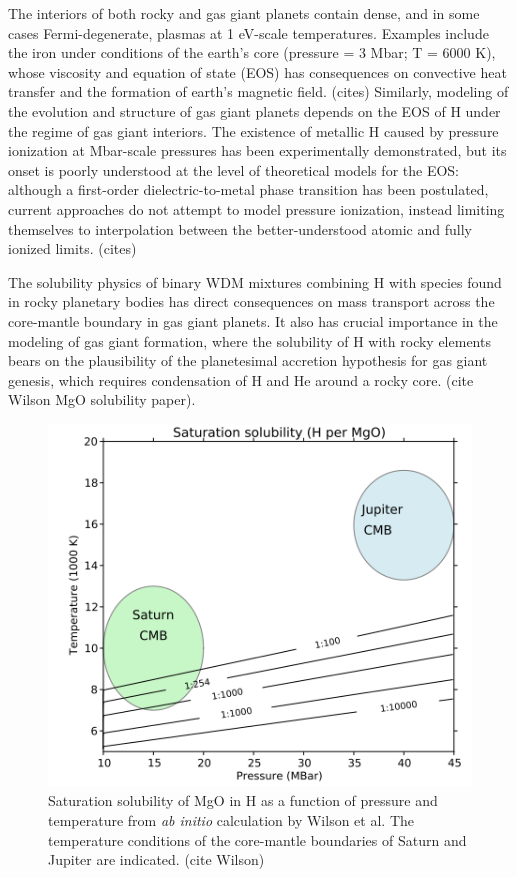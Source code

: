 \documentclass [11pt, proquest, article] {uwthesis}[2016/11/22]
\begin{document}
The interiors of both rocky and gas giant planets contain dense, and in some cases Fermi-degenerate, plasmas at 1 eV-scale temperatures. Examples include the iron under conditions of the earth's core (pressure = 3 Mbar; T = 6000 K), whose viscosity and equation of state (EOS) has consequences on convective heat transfer and the formation of earth's magnetic field. (cites) Similarly, modeling of the evolution and structure of gas giant planets depends on the EOS of H under the regime of gas giant interiors. The existence of metallic H caused by pressure ionization at Mbar-scale pressures has been experimentally demonstrated, but its onset is poorly understood at the level of theoretical models for the EOS: although a first-order dielectric-to-metal phase transition has been postulated, current approaches do not attempt to model pressure ionization, instead limiting themselves to interpolation between the better-understood atomic and fully ionized limits. (cites)

The solubility physics of binary WDM mixtures combining H with species found in rocky planetary bodies has direct consequences on mass transport across the core-mantle boundary in gas giant planets. It also has crucial importance in the modeling of gas giant formation, where the solubility of H with rocky elements bears on the plausibility of the planetesimal accretion hypothesis for gas giant genesis, which requires condensation of H and He around a rocky core. (cite Wilson MgO solubility paper). 

\begin{figure}[h] 
\caption{Saturation solubility of MgO in H as a function of pressure and temperature from \emph{ab initio} calculation by Wilson et al. The temperature conditions of the core-mantle boundaries of Saturn and Jupiter are indicated. (cite Wilson)}
\label{fig:wilson}
\centering
\includegraphics[scale=0.65]{../Figures/wilson_solubility.png}
\end{figure}
\end{document}
